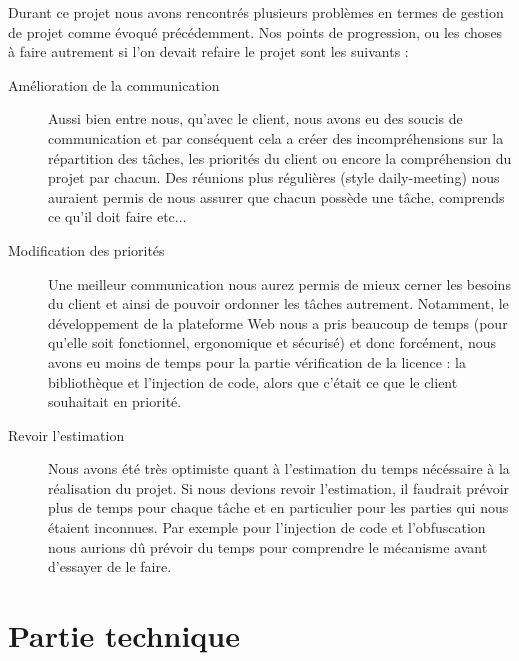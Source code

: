 Durant ce projet nous avons rencontrés plusieurs problèmes en termes de gestion de projet comme évoqué précédemment.
Nos points de progression, ou les choses à faire autrement si l'on devait refaire le projet sont les suivants :
\begin{description}
    \item[Amélioration de la communication]
        Aussi bien entre nous, qu'avec le client, nous avons eu des soucis de communication et par conséquent cela
        a créer des incompréhensions sur la répartition des tâches, les priorités du client ou encore la compréhension
        du projet par chacun. Des réunions plus régulières (style daily-meeting) nous auraient permis de nous assurer
        que chacun possède une tâche, comprends ce qu'il doit faire etc...
    \item[Modification des priorités]
        Une meilleur communication nous aurez permis de mieux cerner les besoins du client et ainsi de pouvoir ordonner
        les tâches autrement. Notamment, le développement de la plateforme Web nous a pris beaucoup de temps (pour qu'elle
        soit fonctionnel, ergonomique et sécurisé) et donc forcément, nous avons eu moins de temps pour la partie vérification
        de la licence : la bibliothèque et l'injection de code, alors que c'était ce que le client souhaitait en priorité.
    \item[Revoir l'estimation]
        Nous avons été très optimiste quant à l'estimation du temps nécéssaire à la réalisation du projet. Si nous devions
        revoir l'estimation, il faudrait prévoir plus de temps pour chaque tâche et en particulier pour les parties qui 
        nous étaient inconnues. Par exemple pour l'injection de code et l'obfuscation nous aurions dû prévoir du temps
        pour comprendre le mécanisme avant d'essayer de le faire.
\end{description}

\section{Partie technique}

